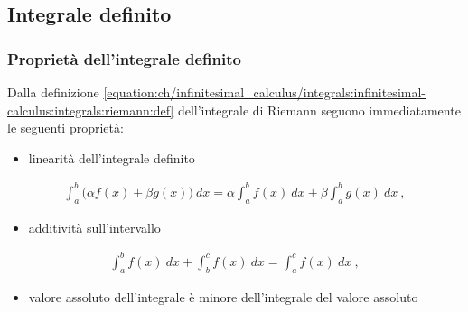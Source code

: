\documentclass[letterpaper,10pt,italian]{jupyterBook}
\begin{document}
\subsection{Integrale definito}
\label{\detokenize{ch/infinitesimal_calculus/integrals:integrale-definito}}\label{\detokenize{ch/infinitesimal_calculus/integrals:infinitesimal-calculus-integrals-def-definite}}

\subsubsection{Proprietà dell’integrale definito}
\label{\detokenize{ch/infinitesimal_calculus/integrals:proprieta-dell-integrale-definito}}\label{\detokenize{ch/infinitesimal_calculus/integrals:infinitesimal-calculus-integrals-def-definite-prop}}
\sphinxAtStartPar
Dalla definizione \eqref{equation:ch/infinitesimal_calculus/integrals:infinitesimal-calculus:integrals:riemann:def} dell’integrale di Riemann seguono immediatamente le seguenti proprietà:
\begin{itemize}
\item {} 
\sphinxAtStartPar
linearità dell’integrale definito

\end{itemize}
\begin{equation}\label{equation:ch/infinitesimal_calculus/integrals:infinitesimal-calculus:integrals:prop:linearity}
\begin{split}\int_a^b \big( \alpha f(x) + \beta g(x) \big) \ dx = \alpha \int_a^b f(x) \ dx + \beta \int_a^b g(x) \ dx \ ,\end{split}
\end{equation}\begin{itemize}
\item {} 
\sphinxAtStartPar
additività sull’intervallo

\end{itemize}
\begin{equation}\label{equation:ch/infinitesimal_calculus/integrals:infinitesimal-calculus:integrals:prop:add}
\begin{split}\int_a^b f(x) \ dx + \int_b^c f(x) \ dx = \int_a^c f(x) \ dx \ ,\end{split}
\end{equation}\begin{itemize}
\item {} 
\sphinxAtStartPar
valore assoluto dell’integrale è minore dell’integrale del valore assoluto

\end{itemize}
\end{document}
